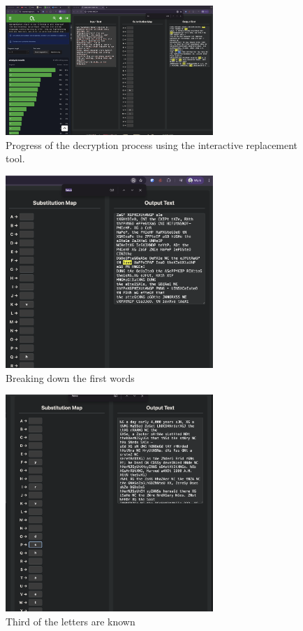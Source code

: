 \documentclass[12pt]{article}
\begin{document}
\begin{figure}
    \centering
    \includegraphics[width=0.7\textwidth]{frequency.png}
    \caption{Progress of the decryption process using the interactive replacement tool.}
\end{figure}
\begin{figure}
    \centering
    \includegraphics[width=0.7\textwidth]{step_1.png}
    \caption{Breaking down the first words}
\end{figure}
\begin{figure}
    \centering
    \includegraphics[width=0.7\textwidth]{step_2.png}
    \caption{Third of the letters are known}
\end{figure}
\end{document}

